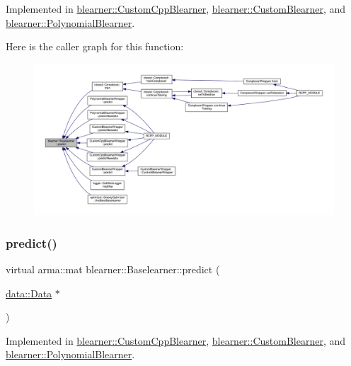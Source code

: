 Implemented in \mbox{\hyperlink{classblearner_1_1_custom_cpp_blearner_aa17db5f5627b8251b2d8484d92e783b9}{blearner\+::\+Custom\+Cpp\+Blearner}}, \mbox{\hyperlink{classblearner_1_1_custom_blearner_a20b5fe06512aa73478b9f934e1c81c31}{blearner\+::\+Custom\+Blearner}}, and \mbox{\hyperlink{classblearner_1_1_polynomial_blearner_a422569884414d31db5a2b770b22176c3}{blearner\+::\+Polynomial\+Blearner}}.

Here is the caller graph for this function\+:\nopagebreak
\begin{figure}[H]
\begin{center}
\leavevmode
\includegraphics[width=350pt]{classblearner_1_1_baselearner_ab37986047db43c84420fef2cef7fc20d_icgraph}
\end{center}
\end{figure}
\mbox{\label{classblearner_1_1_baselearner_ae2ef5e018783578e02b3b5a33fa94eae}} 
\subsubsection{\texorpdfstring{predict()}{predict()}\hspace{0.1cm}{\footnotesize\ttfamily [2/2]}}
{\footnotesize\ttfamily virtual arma\+::mat blearner\+::\+Baselearner\+::predict (\begin{DoxyParamCaption}\item[{\mbox{\hyperlink{classdata_1_1_data}{data\+::\+Data}} $\ast$}]{ }\end{DoxyParamCaption})\hspace{0.3cm}{\ttfamily [pure virtual]}}



Implemented in \mbox{\hyperlink{classblearner_1_1_custom_cpp_blearner_af2326171640e94c3a00f813781710208}{blearner\+::\+Custom\+Cpp\+Blearner}}, \mbox{\hyperlink{classblearner_1_1_custom_blearner_a401a479834eb3896260cb57b4551ceb4}{blearner\+::\+Custom\+Blearner}}, and \mbox{\hyperlink{classblearner_1_1_polynomial_blearner_ae321c17adaab23b0d27685920c2608af}{blearner\+::\+Polynomial\+Blearner}}.

